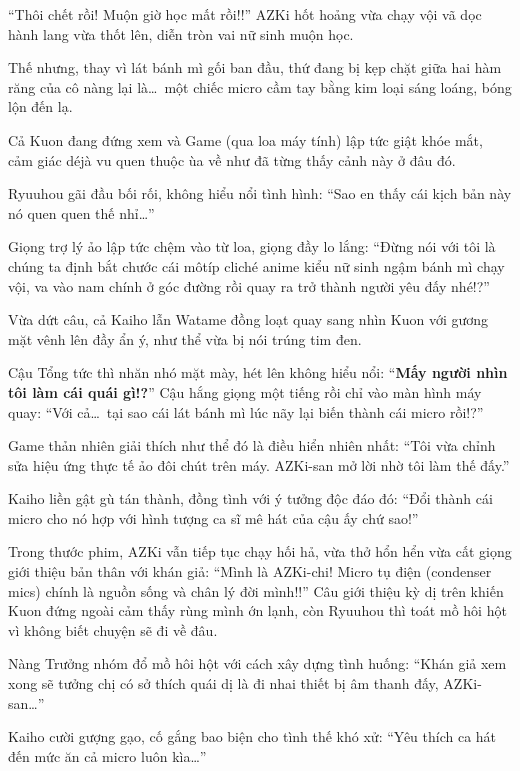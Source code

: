 \documentclass[../main.tex]{subfiles}
\begin{document}
``Thôi chết rồi! Muộn giờ học mất rồi!!'' AZKi hốt hoảng vừa chạy vội vã dọc hành lang vừa thốt lên, diễn tròn vai nữ sinh muộn học.

Thế nhưng, thay vì lát bánh mì gối ban đầu, thứ đang bị kẹp chặt giữa hai hàm răng của cô nàng lại là\dots\ một chiếc micro cầm tay bằng kim loại sáng loáng, bóng lộn đến lạ.


Cả Kuon đang đứng xem và Game (qua loa máy tính) lập tức giật khóe mắt, cảm giác déjà vu quen thuộc ùa về như đã từng thấy cảnh này ở đâu đó.

Ryuuhou gãi đầu bối rối, không hiểu nổi tình hình: ``Sao en thấy cái kịch bản này nó quen quen thế nhỉ\dots''

Giọng trợ lý ảo lập tức chệm vào từ loa, giọng đầy lo lắng: ``Đừng nói với tôi là chúng ta định bắt chước cái môtíp cliché anime kiểu nữ sinh ngậm bánh mì chạy vội, va vào nam chính ở góc đường rồi quay ra trở thành người yêu đấy nhé!?''

Vừa dứt câu, cả Kaiho lẫn Watame đồng loạt quay sang nhìn Kuon với gương mặt vênh lên đầy ẩn ý, như thể vừa bị nói trúng tim đen.

Cậu Tổng tức thì nhăn nhó mặt mày, hét lên không hiểu nổi: ``\textbf{Mấy người nhìn tôi làm cái quái gì!?}'' Cậu hắng giọng một tiếng rồi chỉ vào màn hình máy quay: ``Với cả\dots\ tại sao cái lát bánh mì lúc nãy lại biến thành cái micro rồi!?''

Game thản nhiên giải thích như thể đó là điều hiển nhiên nhất: ``Tôi vừa chỉnh sửa hiệu ứng thực tế ảo đôi chút trên máy. AZKi-san mở lời nhờ tôi làm thế đấy.''

Kaiho liền gật gù tán thành, đồng tình với ý tưởng độc đáo đó: ``Đổi thành cái micro cho nó hợp với hình tượng ca sĩ mê hát của cậu ấy chứ sao!''

Trong thước phim, AZKi vẫn tiếp tục chạy hối hả, vừa thở hổn hển vừa cất giọng giới thiệu bản thân với khán giả: ``Mình là AZKi-chi! Micro tụ điện (condenser mics) chính là nguồn sống và chân lý đời mình!!'' Câu giới thiệu kỳ dị trên khiến Kuon đứng ngoài cảm thấy rùng mình ớn lạnh, còn Ryuuhou thì toát mồ hôi hột vì không biết chuyện sẽ đi về đâu.

Nàng Trưởng nhóm đổ mồ hôi hột với cách xây dựng tình huống: ``Khán giả xem xong sẽ tưởng chị có sở thích quái dị là đi nhai thiết bị âm thanh đấy, AZKi-san\dots''

Kaiho cười gượng gạo, cố gắng bao biện cho tình thế khó xử: ``Yêu thích ca hát đến mức ăn cả micro luôn kìa\dots''
\end{document}
